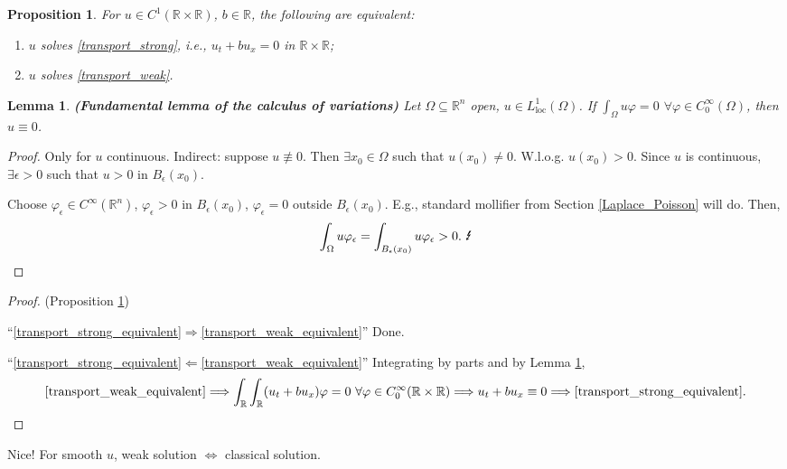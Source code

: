 \documentclass[12pt]{article}
\newtheorem{proposition}{Proposition}[section]
\newtheorem{lemma}{Lemma}[section]
\theoremstyle{definition}
\begin{document}
\begin{proposition}\label{transport_weak_equivalence}
For $u\in C^1(\mathbb R\times\mathbb R)$, $b\in\mathbb R$, the following are equivalent:
\begin{enumerate}[label=(\roman*)]
\item\label{transport_strong_equivalent} $u$ solves \eqref{transport_strong}, i.e., $u_t+bu_x=0$ in $\mathbb R\times\mathbb R$;
\item\label{transport_weak_equivalent} $u$ solves \eqref{transport_weak}.
\end{enumerate}
\end{proposition}

\begin{lemma}\label{calculus_variations}
\emph{\textbf{(Fundamental lemma of the calculus of variations)}} Let $\Omega\subseteq\mathbb R^n$ open, $u\in L_\text{loc}^1(\Omega)$. If $\int_\Omega u\varphi=0$ $\forall\varphi\in C_0^\infty(\Omega)$, then $u\equiv0$.
\end{lemma}

\begin{proof}
Only for $u$ continuous. Indirect: suppose $u\not\equiv0$. Then $\exists x_0\in\Omega$ such that $u(x_0)\neq0$. W.l.o.g. $u(x_0)>0$. Since $u$ is continuous, $\exists\epsilon>0$ such that $u>0$ in $B_\epsilon(x_0)$.

Choose $\varphi_\epsilon\in C^\infty(\mathbb R^n)$, $\varphi_\epsilon>0$ in $B_\epsilon(x_0)$, $\varphi_\epsilon=0$ outside $B_\epsilon(x_0)$. E.g., standard mollifier from Section \ref{Laplace_Poisson} will do. Then,
\[\int_\Omega u\varphi_\epsilon=\int_{B_\epsilon(x_0)}u\varphi_\epsilon>0.\ \text
\Lightning\]
\end{proof}

\begin{proof}
(Proposition \ref{transport_weak_equivalence})

``\ref{transport_strong_equivalent}$\Rightarrow$\ref{transport_weak_equivalent}'' Done.

``\ref{transport_strong_equivalent}$\Leftarrow$\ref{transport_weak_equivalent}'' Integrating by parts and by Lemma \ref{calculus_variations},
\[\text{\ref{transport_weak_equivalent}}\Longrightarrow\int_\mathbb R\int_\mathbb R(u_t+bu_x)\varphi=0\ \forall\varphi\in C_0^\infty(\mathbb R\times\mathbb R)\Longrightarrow u_t+bu_x\equiv0\Longrightarrow\text{\ref{transport_strong_equivalent}}.\]
\end{proof}

Nice! For smooth $u$, weak solution $\Leftrightarrow$ classical solution.
\end{document}
